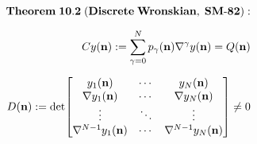 \documentclass[preview]{standalone}
\begin{document}
\begin{align*}
\special{dvisvgm:raw <g id='unique000'>}\mathbf{Theorem\;10.2\;(Discrete\;Wronskian,\;SM\text{-}82):}\\[6pt]Cy(\mathbf{n}) := \sum_{\gamma=0}^N p_\gamma(\mathbf{n})\nabla^\gamma y(\mathbf{n}) = Q(\mathbf{n})\\[6pt]D(\mathbf{n}) := \det\!\begin{bmatrix}y_1(\mathbf{n}) & \cdots & y_N(\mathbf{n}) \\\nabla y_1(\mathbf{n}) & \cdots & \nabla y_N(\mathbf{n}) \\\vdots & \ddots & \vdots \\\nabla^{N-1}y_1(\mathbf{n}) & \cdots & \nabla^{N-1}y_N(\mathbf{n})\end{bmatrix} \neq 0\special{dvisvgm:raw </g>}
\end{align*}
\end{document}
